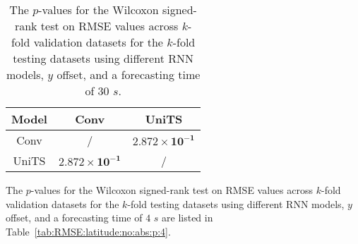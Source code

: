 \begin{table}[!ht]
	\centering
	\begin{tabular}{|c|c|c|}
		\hline
		Model & Conv & UniTS \\ \hline
		Conv & / & $\mathbf{2.872 \times 10^{-1}}$ \\ \hline
		UniTS & $\mathbf{2.872 \times 10^{-1}}$ & / \\ \hline
	\end{tabular}
	\caption{The $p$-values for the Wilcoxon signed-rank test on RMSE values across $k$-fold validation datasets for the $k$-fold testing datasets using different RNN models, $y$ offset, and a forecasting time of $30$ $s$.}
	\label{tab:RMSE:latitude:no:abs:p:30}
\end{table}

The $p$-values for the Wilcoxon signed-rank test on RMSE values across $k$-fold validation datasets for the $k$-fold testing datasets using different RNN models, $y$ offset, and a forecasting time of $4$ $s$ are listed in Table~\ref{tab:RMSE:latitude:no:abs:p:4}.

